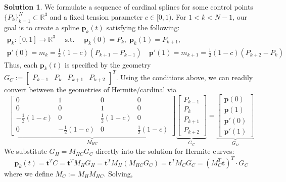 \documentclass[10pt]{article}
\theoremstyle{plain}
\theoremstyle{definition}
\newtheorem*{soln*}{Solution}
\providecommand{\R}{\mathbb{R}}%
\numberwithin{equation}{section}
\providecommand{\st}{\text{ s.t. }}
\begin{document}
\begin{soln*}
    We formulate a sequence of cardinal splines for some control points
    $\{P_k\}_{k=1}^{N} \subset \R^3$ and
    a fixed tension parameter $c \in {[0,1)}$. For $ 1 < k < N-1$,
        our goal is to create a spline $\bm{p}_k(t)$ satisfying the following: 
    \begin{gather*}
    \bm{p}_k: {[0,1]} \rightarrow \R^3 \quad \st \quad
    \bm{p}_k(0) = P_k , \; \bm{p}_k(1) = P_{k+1} , \\
    \bm{p}'(0) = m_k = \frac{1}{2}(1-c)\left(P_{k+1} - P_{k-1}\right) \quad
    \bm{p}'(1) = m_{k+1} = \frac{1}{2}(1-c)\left(P_{k+2} - P_{k}\right) 
    \end{gather*}
    Thus, each $\bm{p}_k(t)$ is specified by the geometry
    $G_C := \begin{bmatrix} P_{k-1} & P_k & P_{k+1} & P_{k+2} \end{bmatrix}^T$.
    Using the conditions above, we can readily convert between the geometries
    of Hermite/cardinal via
    \[
            \underbrace{\begin{bmatrix}
                0 & 1 & 0 & 0 \\
                0 & 0 & 1 & 0 \\
                -\frac{1}{2}(1-c) & 0 & \frac{1}{2}(1-c) & 0 \\
                0 & -\frac{1}{2}(1-c) & 0 & \frac{1}{2}(1-c)
                \end{bmatrix}}_{M_{HC}}
            \underbrace{
            \begin{bmatrix}
                P_{k-1} \\ P_k \\ P_{k+1} \\ P_{k+2}
        \end{bmatrix}}_{G_C}
            =
            \underbrace{
            \begin{bmatrix}
                \bm{p}(0) \\ \bm{p}(1) \\ \bm{p}'(0) \\ \bm{p}'(1)
        \end{bmatrix}}_{G_H}
        \]
    We substitute $G_H = M_{HC} G_C$ directly into the solution for Hermite curves:
    \[
            \bm{p}_k(t) = \bm{t}^T C = \bm{t}^T M_H G_H = \bm{t}^T M_H (M_{HC} G_C )
                        = \bm{t}^T M_C G_C 
                        = (M_C^T \bm{t})^T \cdot G_C
        \]
        where we define $M_C := M_H M_{HC}$. Solving,
    \begin{align*}

\end{align*}
\end{soln*}
\end{document}
